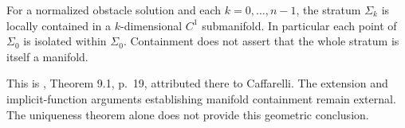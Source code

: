 \begin{theorem}\label{thm:obstacle-singular-stratification}
For a normalized obstacle solution and each $k=0,\ldots,n-1$, the stratum $\Sigma_k$ is locally contained in a $k$-dimensional $C^1$ submanifold. In particular each point of $\Sigma_0$ is isolated within $\Sigma_0$. Containment does not assert that the whole stratum is itself a manifold.

This is \cite{Fig18}, Theorem 9.1, p.~19, attributed there to Caffarelli. The extension and implicit-function arguments establishing manifold containment remain external. The uniqueness theorem alone does not provide this geometric conclusion.
\end{theorem}
